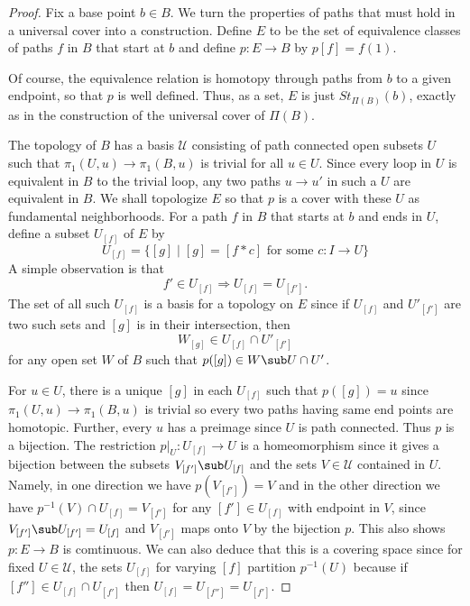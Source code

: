 \begin{proof}
Fix a base point $b\in B$. We turn the properties of paths that must hold in a universal cover into a construction. Define $E$ to be the set of equivalence
classes of paths $f$ in $B$ that start at $b$ and define $p:E\to B$ by $p[f]=f(1)$.\par 
Of course, the equivalence relation is homotopy through paths from $b$ to a given endpoint, so that $p$ is well defined. Thus, as a set, $E$ is just $St_{\Pi(B)}(b)$, exactly as in the construction of the universal cover of $\Pi(B)$.\par 
The topology of $B$ has a basis $\mathcal{U}$ consisting of path connected open subsets $U$ such that $\pi_1(U,u)\to\pi_1(B,u)$ is trivial for all $u\in U$. Since every loop in $U$ is equivalent in $B$ to the trivial loop, any two paths $u\to u'$ in such a $U$ are equivalent in $B$. We shall topologize $E$ so that $p$ is a cover with these $U$ as fundamental neighborhoods. For a path $f$ in $B$ that starts at $b$ and ends in $U$, define a subset $U_{[f]}$ of $E$ by
\[U_{[f]}=\{[g]\mid [g]=[f\ast c]\text{ for some }c:I\to U\}\]
A simple observation is that 
\[f'\in U_{[f]}\Rightarrow U_{[f]}=U_{[f']}.\]
The set of all such $U_{[f]}$ is a basis for a topology on $E$ since if $U_{[f]}$ and $U'_{[f']}$ are two such sets and $[g]$ is in their intersection, then
\[W_{[g]}\in U_{[f]}\cap U'_{[f']}\]
for any open set $W$ of $B$ such that $p([g])\in W\sub U\cap U'$.\par
For $u\in U$, there is a unique $[g]$ in each $U_{[f]}$ such that $p([g])=u$ since $\pi_1(U,u)\to\pi_1(B,u)$ is trivial so every two paths having same end points are homotopic. Further, every $u$ has a preimage since $U$ is path connected. Thus $p$ is a bijection. The restriction $p|_U:U_{[f]}\to U$ is a homeomorphism since it gives a bijection between the subsets $V_{[f']}\sub U_{[f]}$ and the sets $V\in\mathcal{U}$ contained in $U$. Namely, in one direction we have $p(V_{[f']})=V$ and in the other direction we have $p^{-1}(V)\cap U_{[f]}=V_{[f']}$ for any $[f']\in U_{[f]}$ with endpoint in $V$, since $V_{[f']}\sub U_{[f']}=U_{[f]}$ and $V_{[f']}$ maps onto $V$ by the bijection $p$. This also shows $p:E\to B$ is comtinuous. We can also deduce
that this is a covering space since for fixed $U\in\mathcal{U}$, the sets $U_{[f]}$ for varying $[f]$ partition $p^{-1}(U)$ because if $[f'']\in U_{[f]}\cap U_{[f']}$ then $U_{[f]}=U_{[f'']}=U_{[f']}$.\par 

\end{proof}
